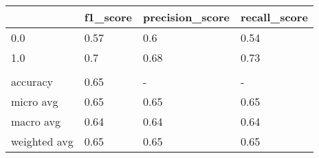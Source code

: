 \begin{tabular}{llll}
\toprule
{} & f1\_score & precision\_score & recall\_score \\
\midrule
0.0          &     0.57 &             0.6 &         0.54 \\
1.0          &      0.7 &            0.68 &         0.73 \\
             &          &                 &              \\
accuracy     &     0.65 &               - &            - \\
micro avg    &     0.65 &            0.65 &         0.65 \\
macro avg    &     0.64 &            0.64 &         0.64 \\
weighted avg &     0.65 &            0.65 &         0.65 \\
\bottomrule
\end{tabular}
